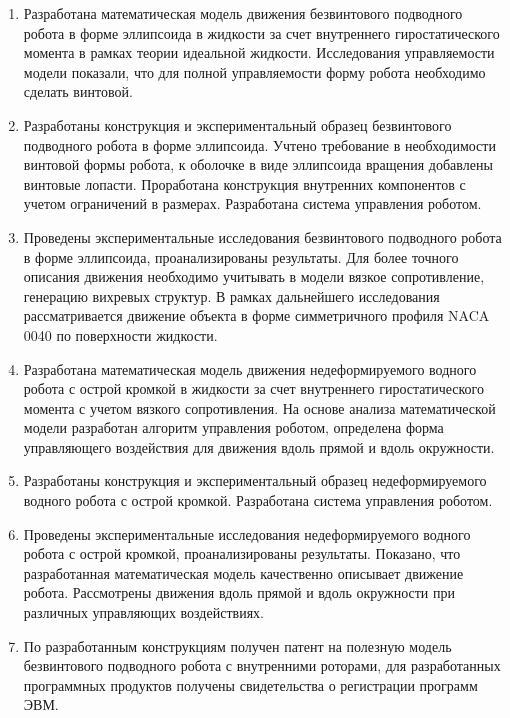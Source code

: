 \begin{enumerate}
  \item Разработана математическая модель движения безвинтового подводного робота в форме эллипсоида в жидкости за счет внутреннего гиростатического момента в рамках теории идеальной жидкости. Исследования управляемости модели показали, что для полной управляемости форму робота необходимо сделать винтовой.
  
  \item Разработаны конструкция и экспериментальный образец безвинтового подводного робота в форме эллипсоида. Учтено требование в необходимости винтовой формы робота, к оболочке в виде эллипсоида вращения добавлены винтовые лопасти. Проработана конструкция внутренних компонентов с учетом ограничений в размерах. Разработана система управления роботом.
  
  \item Проведены экспериментальные исследования безвинтового подводного робота в форме эллипсоида, проанализированы результаты. Для более точного описания движения необходимо учитывать в модели вязкое сопротивление, генерацию вихревых структур. В рамках дальнейшего исследования рассматривается движение объекта в форме симметричного профиля NACA 0040 по поверхности жидкости.
  
  \item Разработана математическая модель движения недеформируемого водного робота с острой кромкой в жидкости за счет внутреннего гиростатического момента с учетом вязкого сопротивления. На основе анализа математической модели разработан алгоритм управления роботом, определена форма управляющего воздействия для движения вдоль прямой и вдоль окружности.
  
  \item Разработаны конструкция и экспериментальный образец недеформируемого водного робота с острой кромкой. Разработана система управления роботом.
  
  \item Проведены экспериментальные исследования недеформируемого водного робота с острой кромкой, проанализированы результаты. Показано, что разработанная математическая модель качественно описывает движение робота. Рассмотрены движения вдоль прямой и вдоль окружности при различных управляющих воздействиях.
  
  \item По разработанным конструкциям получен патент на полезную модель безвинтового подводного робота с внутренними роторами, для разработанных программных продуктов получены свидетельства о регистрации программ ЭВМ.
\end{enumerate}
